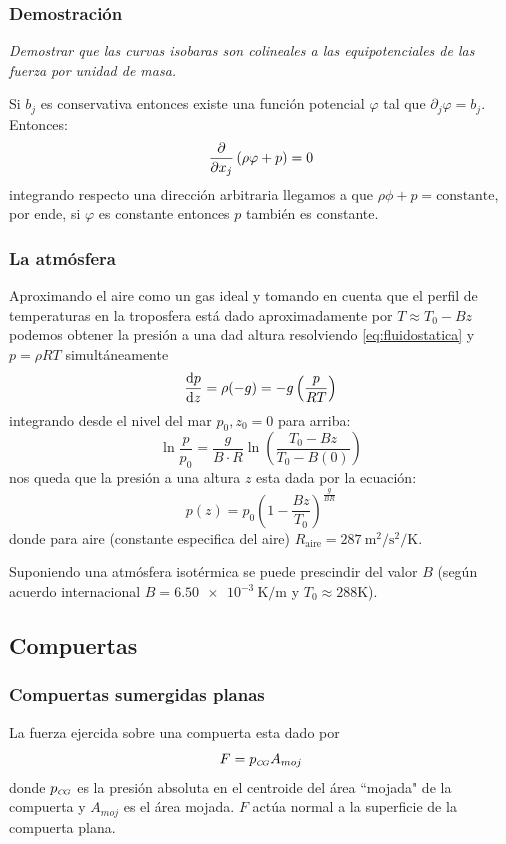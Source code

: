 \subsubsection*{Demostración}
\textit{Demostrar que las curvas isobaras son colineales a las equipotenciales de las fuerza por unidad de masa.}

Si $b_j$ es conservativa entonces existe una función potencial $\varphi$ tal que $\partial_j \varphi =b_j$. Entonces:
\[
\frac{\partial }{\partial x_j}\left(\rho \varphi +p \right) = 0
\]
integrando respecto una dirección arbitraria llegamos a que $\rho \phi+p=\textrm{constante}$, por ende, si $\varphi$ es constante entonces $p$ también es constante.

\subsubsection*{La atmósfera}
Aproximando el aire como un gas ideal y tomando en cuenta que el perfil de temperaturas en la troposfera está dado aproximadamente por $T\approx T_0 -B z$ podemos obtener la presión a una dad altura resolviendo \eqref{eq:fluidostatica} y $p=\rho R T$ simultáneamente
\[
 \frac{\textrm{d} p}{\textrm{d} z}=\rho( -g) =-g\left(\frac{p}{RT}  \right) 
\]
integrando desde el nivel del mar $p_0,z_0=0$ para arriba:
\[
\ln \frac{p}{p_0}= \frac{g}{B\cdot R} \ln\left(\frac{T_0-Bz}{T_0-B(0)}\right) 
\]
nos queda que la presión a una altura $z$ esta dada por la ecuación:
\[
p(z) = p_0 \left( 1-\frac{Bz}{T_0}\right)^{\frac{g}{BR}}
\]
donde para aire (constante especifica del aire) $R_{\textrm{aire}}=\SI{287}{\meter \squared \per \second \squared \per \kelvin}$.

Suponiendo una atmósfera isotérmica se puede prescindir del valor $B$ (según acuerdo internacional $B=\SI{6,50e-3}{\kelvin \per \meter}$ y  $T_0\approx 288 \si{\kelvin}$).

\newcommand{\CP}{{\mbox{\tiny $C\!P$}}}
\newcommand{\CG}{{\mbox{\tiny $C\!G$}}}
\subsection{Compuertas}
\subsubsection*{Compuertas sumergidas planas}
La fuerza ejercida sobre una compuerta esta dado por
\begin{equation}
F=p_{\CG}A_{moj}
\end{equation}
donde $p_{\CG}$ es la presión absoluta en el centroide del área ``mojada"{} de la compuerta y $A_{moj}$ es el área mojada. $F$ actúa normal a la superficie de la compuerta plana.

